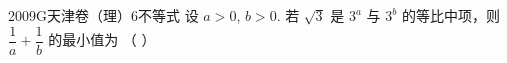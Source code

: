 
\begin{problem}{2009}{G}{天津卷（理）}{6}{不等式}
设 $a>0$, $b>0$. 若 $\sqrt{3}$ 是 $3^a$ 与 $3^b$ 的等比中项，则 $\dfrac{1}{a}+\dfrac{1}{b}$ 的最小值为 \hspace{1cm} （ ）
\begin{choices}
\end{choices}
\end{problem}

\begin{answer}

\end{answer}

\begin{solutions}

\end{solutions}